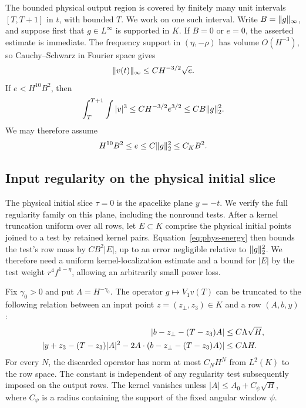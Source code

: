 The bounded physical output region is covered by finitely many unit
intervals $[T,T+1]$ in $t$, with bounded $T$.  We work on one such
interval.  Write $B=\lVert g\rVert_\infty$, and suppose first that
$g\in L^\infty$ is supported in $K$.  If $B=0$ or $e=0$, the asserted
estimate is immediate.  The frequency support in
$(\eta,-\rho)$ has volume $O(H^{-3})$, so Cauchy--Schwarz in Fourier
space gives
\begin{equation}
 \lVert v(t)\rVert_\infty\le C H^{-3/2}\sqrt e.
 \label{eq:phys-bernstein}
\end{equation}
If $e<H^{10}B^2$, then
\begin{equation}
 \int_T^{T+1}\int |v|^3
 \le C H^{-3/2}e^{3/2}
 \le C B\lVert g\rVert_2^2.
 \label{eq:phys-small-energy}
\end{equation}
We may therefore assume
\begin{equation}
 H^{10}B^2\le e\le C\lVert g\rVert_2^2\le C_K B^2.
 \label{eq:phys-energy-range}
\end{equation}

\subsection{Input regularity on the physical initial slice}

The physical initial slice $\tau=0$ is the spacelike plane $y=-t$.
We verify the full regularity family on this plane, including the
nonround tests. After a kernel truncation uniform over all rows, let
$E\subset K$ comprise the physical initial points joined to a test by
retained kernel pairs. Equation~\eqref{eq:phys-energy} then bounds the
test's row mass by $CB^2|E|$, up to an error negligible relative to
$\lVert g\rVert_2^2$. We therefore need a uniform kernel-localization estimate
and a bound for $|E|$ by the test weight $r^4f^{1-\eta}$, allowing an
arbitrarily small power loss.

\begin{lemma}
\label{lem:phys-initial-kernel}
Fix $\gamma_0>0$ and put $\Lambda=H^{-\gamma_0}$.  The operator
$g\mapsto V_1v(T)$ can be truncated to the following relation between
an input point $z=(z_\perp,z_3)\in K$ and a row $(A,b,y)$:
\begin{align}
 |b-z_\perp-(T-z_3)A|&\le C\Lambda\sqrt H,\notag\\
 |y+z_3-(T-z_3)|A|^2
       -2A\cdot(b-z_\perp-(T-z_3)A)|&\le C\Lambda H.
 \label{eq:phys-predecessor-relation}
\end{align}
For every $N$, the discarded operator has norm at most $C_NH^N$
from $L^2(K)$ to the row space.  The constant is independent of any
regularity test subsequently imposed on the output rows.
The kernel vanishes unless $|A|\le A_0+C_\psi\sqrt H$, where
$C_\psi$ is a radius containing the support of the fixed angular
window $\psi$.
\end{lemma}

